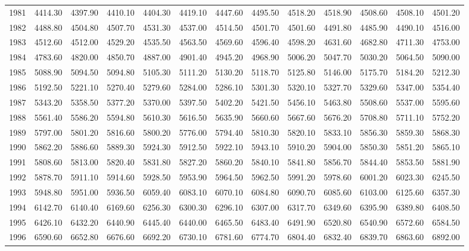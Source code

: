 \begin{longtable}{rrrrrrrrrrrrr}
  1981 & 4414.30 & 4397.90 & 4410.10 & 4404.30 & 4419.10 & 4447.60 & 4495.50 & 4518.20 & 4518.90 & 4508.60 & 4508.10 & 4501.20 \\ 
  1982 & 4488.80 & 4504.80 & 4507.70 & 4531.30 & 4537.00 & 4514.50 & 4501.70 & 4501.60 & 4491.80 & 4485.90 & 4490.10 & 4516.00 \\ 
  1983 & 4512.60 & 4512.00 & 4529.20 & 4535.50 & 4563.50 & 4569.60 & 4596.40 & 4598.20 & 4631.60 & 4682.80 & 4711.30 & 4753.00 \\ 
  1984 & 4783.60 & 4820.00 & 4850.70 & 4887.00 & 4901.40 & 4945.20 & 4968.90 & 5006.20 & 5047.70 & 5030.20 & 5064.50 & 5090.00 \\ 
  1985 & 5088.90 & 5094.50 & 5094.80 & 5105.30 & 5111.20 & 5130.20 & 5118.70 & 5125.80 & 5146.00 & 5175.70 & 5184.20 & 5212.30 \\ 
  1986 & 5192.50 & 5221.10 & 5270.40 & 5279.60 & 5284.00 & 5286.10 & 5301.30 & 5320.10 & 5327.70 & 5329.60 & 5347.00 & 5354.40 \\ 
  1987 & 5343.20 & 5358.50 & 5377.20 & 5370.00 & 5397.50 & 5402.20 & 5421.50 & 5456.10 & 5463.80 & 5508.60 & 5537.00 & 5595.60 \\ 
  1988 & 5561.40 & 5586.20 & 5594.80 & 5610.30 & 5616.50 & 5635.90 & 5660.60 & 5667.60 & 5676.20 & 5708.80 & 5711.10 & 5752.20 \\ 
  1989 & 5797.00 & 5801.20 & 5816.60 & 5800.20 & 5776.00 & 5794.40 & 5810.30 & 5820.10 & 5833.10 & 5856.30 & 5859.30 & 5868.30 \\ 
  1990 & 5862.20 & 5886.60 & 5889.30 & 5924.30 & 5912.50 & 5922.10 & 5943.10 & 5910.20 & 5904.00 & 5850.30 & 5851.20 & 5865.10 \\ 
  1991 & 5808.60 & 5813.00 & 5820.40 & 5831.80 & 5827.20 & 5860.20 & 5840.10 & 5841.80 & 5856.70 & 5844.40 & 5853.50 & 5881.90 \\ 
  1992 & 5878.70 & 5911.10 & 5914.60 & 5928.50 & 5953.90 & 5964.50 & 5962.50 & 5991.20 & 5978.60 & 6001.20 & 6023.30 & 6245.50 \\ 
  1993 & 5948.80 & 5951.00 & 5936.50 & 6059.40 & 6083.10 & 6070.10 & 6084.80 & 6090.70 & 6085.60 & 6103.00 & 6125.60 & 6357.30 \\ 
  1994 & 6142.70 & 6140.40 & 6169.60 & 6256.30 & 6300.30 & 6296.10 & 6307.00 & 6317.70 & 6349.60 & 6395.90 & 6389.80 & 6408.50 \\ 
  1995 & 6426.10 & 6432.20 & 6440.90 & 6445.40 & 6440.00 & 6465.50 & 6483.40 & 6491.90 & 6520.80 & 6540.90 & 6572.60 & 6584.50 \\ 
  1996 & 6590.60 & 6652.80 & 6676.60 & 6692.20 & 6730.10 & 6781.60 & 6774.70 & 6804.40 & 6832.40 & 6839.70 & 6863.60 & 6892.00 \\ 

\end{longtable}

